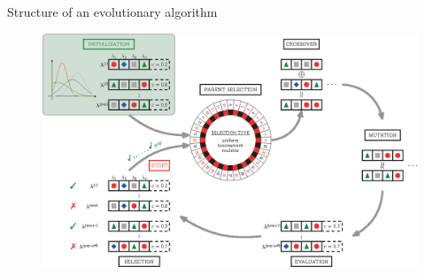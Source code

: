 \documentclass[11pt,compress,t,notes=noshow, xcolor=table]{beamer}
\begin{document}
\begin{vbframe}{Structure of an evolutionary algorithm}

\begin{figure}
  \includegraphics{figure_man/ea.eps}
\end{figure}


\end{vbframe}
\end{document}
